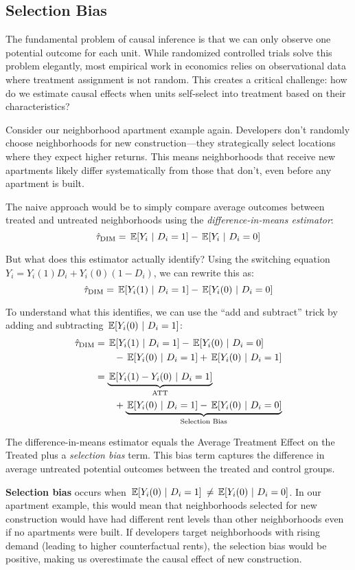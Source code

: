 \documentclass[12pt]{article}
\begin{document}
\begin{multicols}{2}
\section*{Selection Bias}

The fundamental problem of causal inference is that we can only observe one potential outcome for each unit.
While randomized controlled trials solve this problem elegantly, most empirical work in economics relies on observational data where treatment assignment is not random.
This creates a critical challenge: how do we estimate causal effects when units self-select into treatment based on their characteristics?

Consider our neighborhood apartment example again.
Developers don't randomly choose neighborhoods for new construction---they strategically select locations where they expect higher returns.
This means neighborhoods that receive new apartments likely differ systematically from those that don't, even before any apartment is built.

The naive approach would be to simply compare average outcomes between treated and untreated neighborhoods using the \emph{difference-in-means estimator}:
$$\hat{\tau}_{\text{DIM}} = \expec{Y_i}{D_i = 1} - \expec{Y_i}{D_i = 0}$$

But what does this estimator actually identify?
Using the switching equation $Y_i = Y_i(1)D_i + Y_i(0)(1-D_i)$, we can rewrite this as:
$$\hat{\tau}_{\text{DIM}} = \expec{Y_i(1)}{D_i = 1} - \expec{Y_i(0)}{D_i = 0}$$

To understand what this identifies, we can use the ``add and subtract'' trick by adding and subtracting $\expec{Y_i(0)}{D_i = 1}$:
\begin{align*}
\hat{\tau}_{\text{DIM}} &= \expec{Y_i(1)}{D_i = 1} - \expec{Y_i(0)}{D_i = 0} \\
&\quad\quad - \expec{Y_i(0)}{D_i = 1} + \expec{Y_i(0)}{D_i = 1} \\[0.5em]
&= \underbrace{\expec{Y_i(1) - Y_i(0)}{D_i = 1}}_{\text{ATT}} \\ 
&\quad\quad+ \underbrace{\expec{Y_i(0)}{D_i = 1} - \expec{Y_i(0)}{D_i = 0}}_{\text{Selection Bias}}
\end{align*}

The difference-in-means estimator equals the Average Treatment Effect on the Treated plus a \emph{selection bias} term.
This bias term captures the difference in average untreated potential outcomes between the treated and control groups.

\textbf{Selection bias} occurs when $\expec{Y_i(0)}{D_i = 1}$ $\neq\expec{Y_i(0)}{D_i = 0}$.
In our apartment example, this would mean that neighborhoods selected for new construction would have had different rent levels than other neighborhoods even if no apartments were built.
If developers target neighborhoods with rising demand (leading to higher counterfactual rents), the selection bias would be positive, making us overestimate the causal effect of new construction.


\end{multicols}
\end{document}
